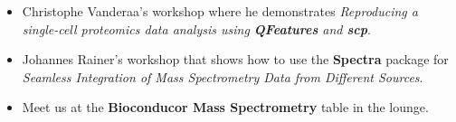 \documentclass[final]{beamer}
\newcommand{\bpkg}[1]{{\textbf{#1}}}
\begin{document}
\begin{frame}[fragile]
\begin{columns}[T]
\begin{column}{.38\textwidth}
\begin{block}{}
\begin{itemize}
          \item \justifying Christophe Vanderaa's workshop where he
            demonstrates \textit{Reproducing a single-cell proteomics
              data analysis using \bpkg{QFeatures} and \bpkg{scp}}.

          \item Johannes Rainer's workshop that shows how to use the
            \bpkg{Spectra} package for \textit{Seamless Integration of
              Mass Spectrometry Data from Different Sources}.

          \item Meet us at the \textbf{Bioconducor Mass Spectrometry}
            table in the lounge.

        \end{itemize}

      \end{block}



    \end{column}


\end{columns}
\end{frame}
\end{document}
